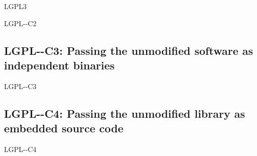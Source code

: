 \begin{license}{LGPL3}
\begin{lsuc}{LGPL-\ver-C2}
  \begin{lsucprohibits}
    \lsucitem{\noPatentLitigation}
  \end{lsucprohibits}
\end{lsuc}

\subsection{LGPL-\ver-C3: Passing the unmodified software as independent binaries}
\begin{lsuc}{LGPL-\ver-C3} 

  \useCaseThree

  \begin{lsucrequires}
    \lsucmandatory{\keepLicensingElements}
    \lsucmandatory{\lgplthreeEnsureCopyrightNoticeBinary}
    \lsucmandatory{\giveLicense}\passingFilesCorrectly
    \lsucmandatory{\makeUnmodifiedSourceAvailable}
    \lsucmandatory{\describeHowToGetSource}
    \lsucmandatory{\retainCopyrightNotices}
    \lsucoptional{\addToDocumentation}
  \end{lsucrequires}

  \begin{lsucprohibits}
    \lsucitem{\noPatentLitigation}
  \end{lsucprohibits}
\end{lsuc}

\subsection{LGPL-\ver-C4: Passing the unmodified library as embedded source code}
\begin{lsuc}{LGPL-\ver-C4}

  \useCaseFour

  \begin{lsucrequires}
    \lsucmandatory{\keepLicensingElements}
    \lsucmandatory{\lgplthreeEnsureCopyrightNoticeSource}
    \lsucmandatory{\giveLicense}\passingFilesCorrectly
    \lsucmandatory{\retainCopyrightNotices}
    \lsucmandatory{\addToCopyrightDialogLibWeak}
    \lsucoptional{\addToDocumentation}
  \end{lsucrequires}

  \begin{lsucprohibits}
    \lsucitem{\noPatentLitigation}
  \end{lsucprohibits}
\end{lsuc}


\end{license}

